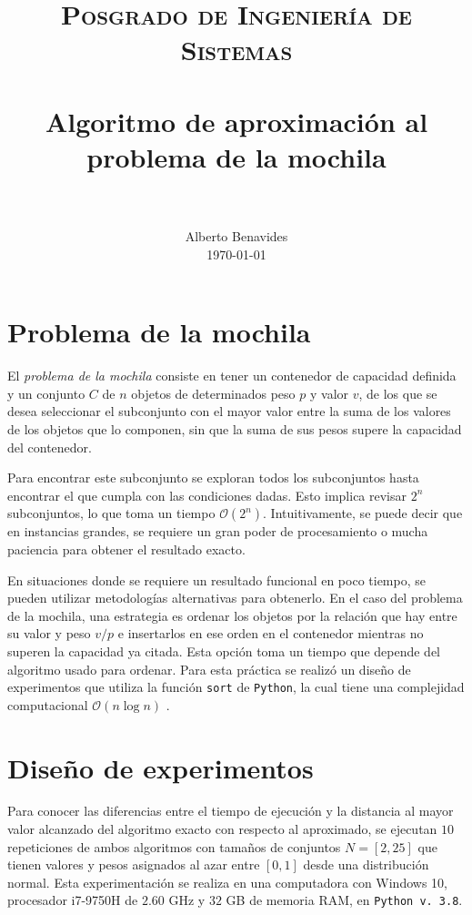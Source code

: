 \documentclass[paper=leter, fontsize=11pt]{scrartcl}
\title{
		\usefont{OT1}{bch}{b}{n}
		\normalfont \normalsize \textsc{Posgrado de Ingeniería de Sistemas} \\ [25pt]
		\horrule{0.5pt} \\[0.4cm]
		\huge Algoritmo de aproximación al problema de la mochila \\
		\horrule{2pt} \\[0.5cm]
}
\author{
		\normalfont 								\normalsize
        Alberto Benavides\\[-3pt]		\normalsize
        \today
}
\date{}
\numberwithin{equation}{section}		%
\numberwithin{figure}{section}			%
\numberwithin{table}{section}				%
\begin{document}
\maketitle

\section{Problema de la mochila}
El \textit{problema de la mochila} consiste en tener un contenedor de capacidad definida y un conjunto $C$ de $n$ objetos de determinados peso $p$ y valor $v$, de los que se desea seleccionar el subconjunto con el mayor valor entre la suma de los valores de los objetos que lo componen, sin que la suma de sus pesos supere la capacidad del contenedor.

Para encontrar este subconjunto se exploran todos los subconjuntos hasta encontrar el que cumpla con las condiciones dadas. Esto implica revisar $2^n$ subconjuntos, lo que toma un tiempo $\mathcal{O}(2^n)$. Intuitivamente, se puede decir que en instancias grandes, se requiere un gran poder de procesamiento o mucha paciencia para obtener el resultado exacto.

En situaciones donde se requiere un resultado funcional en poco tiempo, se pueden utilizar metodologías alternativas para obtenerlo. En el caso del problema de la mochila, una estrategia es ordenar los objetos por la relación que hay entre su valor y peso $v / p$ e insertarlos en ese orden en el contenedor mientras no superen la capacidad ya citada. Esta opción toma un tiempo que depende del algoritmo usado para ordenar. Para esta práctica se realizó un diseño de experimentos que utiliza la función \texttt{sort} \cite{python-sort} de \texttt{Python}, la cual tiene una complejidad computacional $\mathcal{O}(n \log{n})$ \cite{python-sort-complexity}.

\section{Diseño de experimentos}

Para conocer las diferencias entre el tiempo de ejecución y la distancia al mayor valor alcanzado del algoritmo exacto con respecto al aproximado, se ejecutan $10$ repeticiones de ambos algoritmos con tamaños de conjuntos $N = [2, 25]$ que tienen valores y pesos asignados al azar entre $[0, 1]$ desde una distribución normal. Esta experimentación se realiza en una computadora con Windows 10, procesador i7-9750H de $2.60$ GHz y $32$ GB de memoria RAM, en \texttt{Python v. 3.8}.
\end{document}
